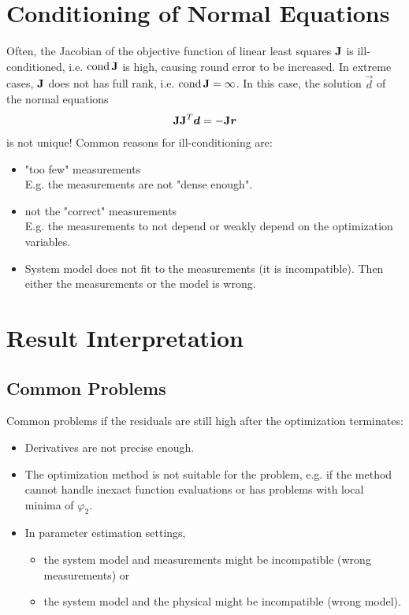 	\section{Conditioning of Normal Equations}
		Often, the Jacobian of the objective function of linear least squares \( \bm{\mathrm{J}} \) is ill-conditioned, i.e. \( \operatorname{cond} \bm{\mathrm{J}} \) is high, causing round error to be increased. In extreme cases, \( \bm{\mathrm{J}} \) does not has full rank, i.e. \( \operatorname{cond} \bm{\mathrm{J}} = \infty \). In this case, the solution \( \vec{d} \) of the normal equations
		\begin{align*}
			\bm{\mathrm{J}} \bm{\mathrm{J}}^T \bm{d} = -\bm{\mathrm{J}}\bm{r}
		\end{align*}
		is not unique! Common reasons for ill-conditioning are:
		\begin{itemize}
			\item "too few" measurements \\ E.g. the measurements are not "dense enough".
			\item not the "correct" measurements \\ E.g. the measurements to not depend or weakly depend on the optimization variables.
			\item System model does not fit to the measurements (it is incompatible). Then either the measurements or the model is wrong.
		\end{itemize}

	\section{Result Interpretation}
		\subsection{Common Problems}
			Common problems if the residuals are still high after the optimization terminates:
			\begin{itemize}
				\item Derivatives are not precise enough.
				\item The optimization method is not suitable for the problem, e.g. if the method cannot handle inexact function evaluations or has problems with local minima of \(\varphi_2\).
				\item In parameter estimation settings,
					\begin{itemize}
						\item the system model and measurements might be incompatible (wrong measurements) or
						\item the system model and the physical might be incompatible (wrong model).
					\end{itemize}
			\end{itemize}

